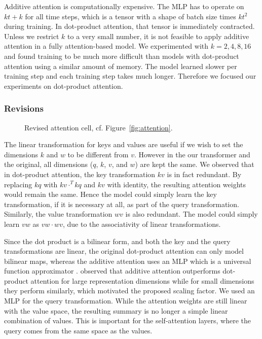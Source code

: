 \documentclass[11pt]{article}
\DeclareMathOperator{\softmax}{softmax}
\begin{document}
Additive attention is computationally expensive.
The MLP has to operate on \(kt + k\) for all time steps,
which is a tensor with a shape of batch size times \(kt^{2}\) during training.
In dot-product attention, that tensor is immediately contracted.
Unless we restrict \(k\) to a very small number,
it is not feasible to apply additive attention in a fully attention-based model.
We experimented with \(k = 2, 4, 8, 16\) and found training to be much more difficult than
models with dot-product attention using a similar amount of memory.
The model learned slower per training step and each training step takes much longer.
Therefore we focused our experiments on dot-product attention.

\subsubsection*{Revisions}

\begin{figure}
  \centering
  \caption{\label{fig:revis}Revised attention cell, cf. Figure~\ref{fig:attention}.}
\end{figure}

The linear transformation for keys and values are useful
if we wish to set the dimensions \(k\) and \(w\) to be different from \(v\).
However in the our transformer and the original,
all dimensions (\(q\), \(k\), \(v\), and \(w\)) are kept the same.
We observed that in dot-product attention,
the key transformation \(kv\) is in fact redundant.
By replacing \(kq\) with \(kv \cdot^{T} kq\) and \(kv\) with identity,
the resulting attention weights would remain the same.
Hence the model could simply learn the key transformation, if it is necessary at all,
as part of the query transformation.
Similarly, the value transformation \(wv\) is also redundant.
The model could simply learn \(vw\) as \(vw \cdot wv\),
due to the associativity of linear transformations.

Since the dot product is a bilinear form,
and both the key and the query transformations are linear,
the original dot-product attention can only model bilinear maps,
whereas the additive attention uses an MLP which is
a universal function approximator \parencite{hornik1989multilayer}.
\textcite{vaswani2017attention} observed that additive attention outperforms dot-product attention
for large representation dimensions while for small dimensions they perform similarly,
which motivated the proposed scaling factor.
We used an MLP for the query transformation.
While the attention weights are still linear with the value space,
the resulting summary is no longer a simple linear combination of values.
This is important for the self-attention layers,
where the query comes from the same space as the values.
\end{document}
